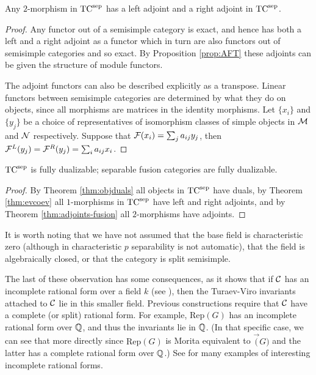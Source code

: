 \documentclass{amsart}
\begin{document}
\begin{theorem} \label{thm:adjoints-fusion}
Any $2$-morphism in ${\mathrm{TC}^{\text{sep}}}$ has a left adjoint and a right adjoint in ${\mathrm{TC}^{\text{sep}}}$.
\end{theorem}
\begin{proof}
Any functor out of a semisimple category is exact, and hence has both a left and a right adjoint as a functor which in turn are also functors out of semisimple categories and so exact.  By Proposition \ref{prop:AFT} these adjoints can be given the structure of module functors.

The adjoint functors can also be described explicitly as a transpose.  Linear functors between semisimple categories are determined by what they do on objects, since all morphisms are matrices in the identity morphisms.  Let $\{x_i\}$ and $\{y_j\}$ be a choice of representatives of isomorphism classes of simple objects in $\mathcal M$ and $\mathcal N$ respectively.  Suppose that $\mathcal F(x_i) = \sum_j a_{ij} y_j$, then $\mathcal F^L(y_j) = \mathcal F^R(y_j) = \sum_i a_{ij} x_i$. 
\end{proof}

\begin{theorem}  \label{thm:TC-dualizable}
 ${\mathrm{TC}^{\text{sep}}}$ is fully dualizable; separable fusion categories are fully dualizable.
\end{theorem}
\begin{proof}
By Theorem \ref{thm:objduals} all objects in ${\mathrm{TC}^{\text{sep}}}$ have duals, by Theorem \ref{thm:evcoev} all $1$-morphisms in ${\mathrm{TC}^{\text{sep}}}$ have left and right adjoints, and by Theorem \ref{thm:adjoints-fusion} all $2$-morphisms have adjoints.
\end{proof}


\begin{remark}
It is worth noting that we have not assumed that the base field is characteristic zero (although in characteristic $p$ separability is not automatic), that the field is algebraically closed, or that the category is split semisimple.  

The last of these observation has some consequences, as it shows that if $\mathcal C$ has an incomplete rational form over a field $k$ (see \cite{1002.0168}), then the Turaev-Viro invariants attached to $\mathcal C$ lie in this smaller field.  Previous constructions require that $\mathcal C$ have a complete (or split) rational form.  For example, $\mathrm{Rep}(G)$ has an incomplete rational form over $\mathbb Q$, and thus the invariants lie in $\mathbb Q$.  (In that specific case, we can see that more directly since $\mathrm{Rep}(G)$ is Morita equivalent to $\Vec(G)$ and the latter has a complete rational form over $\mathbb Q$.)  See \cite{1102.0657} for many examples of interesting incomplete rational forms.
\end{remark}
\end{document}
